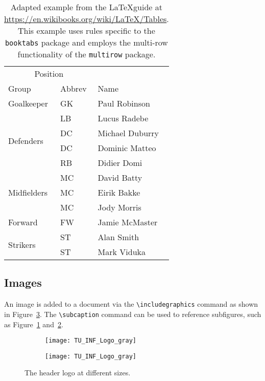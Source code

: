 \begin{table}[h] %
  \centering
  \begin{tabular}{lll}
    \toprule
    \multicolumn{2}{c}{Position} \\
    \cmidrule{1-2} %
    Group & Abbrev & Name \\
    \midrule
    Goalkeeper & GK & Paul Robinson \\
    \midrule
    \multirow{4}{*}{Defenders} & LB & Lucus Radebe \\
                               & DC & Michael Duburry \\
                               & DC & Dominic Matteo \\
                               & RB & Didier Domi \\
    \midrule
    \multirow{3}{*}{Midfielders} & MC & David Batty \\
                                 & MC & Eirik Bakke \\
                                 & MC & Jody Morris \\
    \midrule
    Forward & FW & Jamie McMaster \\
    \midrule
    \multirow{2}{*}{Strikers} & ST & Alan Smith \\
                              & ST & Mark Viduka \\
    \bottomrule
  \end{tabular}
  \caption{Adapted example from the \LaTeX guide at \url{https://en.wikibooks.org/wiki/LaTeX/Tables}. This example uses rules specific to the \texttt{booktabs} package and employs the multi-row functionality of the \texttt{multirow} package.}
  \label{tab:intro} %
\end{table}

\subsection{Images}

An image is added to a document via the \verb|\includegraphics| command as shown in Figure~\ref{fig:intro}.
The \verb|\subcaption| command can be used to reference subfigures, such as Figure~\ref{fig:intro:full width} and~\ref{fig:intro:half width}.

\begin{figure}[h]
  \begin{subfigure}[b]{0.5\columnwidth}
    \centering
    \texttt{[image: TU\_INF\_Logo\_gray]}
    \label{fig:intro:full width}
  \end{subfigure}
  \begin{subfigure}[b]{0.5\columnwidth}
    \centering
    \texttt{[image: TU\_INF\_Logo\_gray]}
    \label{fig:intro:half width}
  \end{subfigure}
  \caption{The header logo at different sizes.}
  \label{fig:intro} %
\end{figure}

